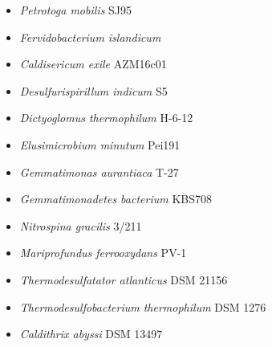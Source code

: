 \begin{itemize}
    \item \textit{Petrotoga mobilis} SJ95
    \item \textit{Fervidobacterium islandicum}
    \item \textit{Caldisericum exile} AZM16c01
    \item \textit{Desulfurispirillum indicum} S5
    \item \textit{Dictyoglomus thermophilum} H-6-12
    \item \textit{Elusimicrobium minutum} Pei191
    \item \textit{Gemmatimonas aurantiaca} T-27
    \item \textit{Gemmatimonadetes bacterium} KBS708
    \item \textit{Nitrospina gracilis} 3/211
    \item \textit{Mariprofundus ferrooxydans} PV-1
    \item \textit{Thermodesulfatator atlanticus} DSM 21156
    \item \textit{Thermodesulfobacterium thermophilum} DSM 1276
    \item \textit{Caldithrix abyssi} DSM 13497
\end{itemize}

